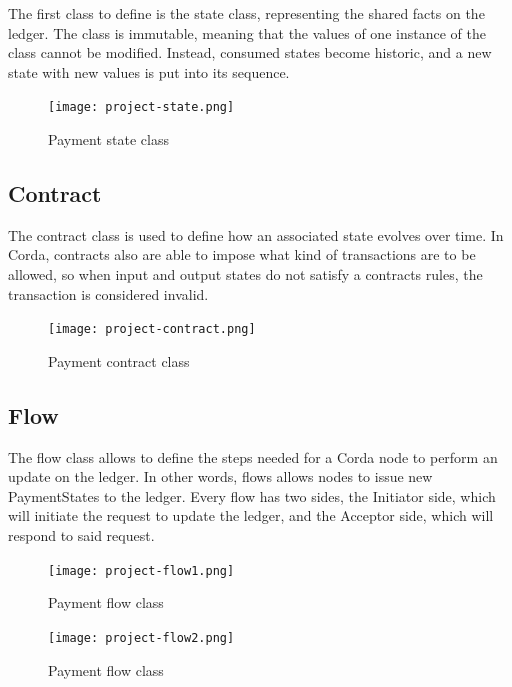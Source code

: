 The first class to define is the state class, representing the shared facts on the ledger. The class is immutable, meaning that the values of one instance of the class cannot be modified. Instead, consumed states become historic, and a new state with new values is put into its sequence.

\begin{figure}[h]
    \centering
    \texttt{[image: project-state.png]}
    \caption{
       Payment state class
        }
\end{figure}

\newpage

\subsection{Contract}

The contract class is used to define how an associated state evolves over time. In Corda, contracts also are able to impose what kind of transactions are to be allowed, so when input and output states do not satisfy a contracts rules, the transaction is considered invalid.

\begin{figure}[h]
    \centering
    \texttt{[image: project-contract.png]}
    \caption{
       Payment contract class
        }
\end{figure}


\newpage

\subsection{Flow}

The flow class allows to define the steps needed for a Corda node to perform an update on the ledger. In other words, flows allows nodes to issue new PaymentStates to the ledger. Every flow has two sides, the Initiator side, which will initiate the request to update the ledger, and the Acceptor side, which will respond to said request.

\begin{figure}[h]
    \centering
    \texttt{[image: project-flow1.png]}
    \caption{
        Payment flow class
         }
\end{figure}
\begin{figure}[h]
    \centering
    \texttt{[image: project-flow2.png]}
    \caption{
        Payment flow class
         }
\end{figure}

\newpage

